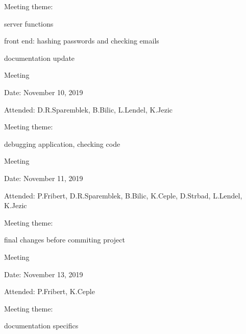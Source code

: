 \begin{packed_enum}
\begin{packed_item}
				\item Meeting theme:
				\begin{packed_item}
					\item  server functions
					\item  front end: hashing passwords and checking emails
					\item  documentation update
				\end{packed_item}
			\end{packed_item}
			\item  Meeting
			\item[] \begin{packed_item}
				\item Date: November 10, 2019
				\item Attended: D.R.Sparemblek, B.Bilic, L.Lendel, K.Jezic
				\item Meeting theme:
				\begin{packed_item}
					\item  debugging application, checking code
				\end{packed_item}
			\end{packed_item}
			\item  Meeting
			\item[] \begin{packed_item}
				\item Date: November 11, 2019
				\item Attended: P.Fribert, D.R.Sparemblek, B.Bilic, K.Ceple, D.Strbad, L.Lendel, K.Jezic
				\item Meeting theme:
				\begin{packed_item}
					\item  final changes before commiting project
				\end{packed_item}
			\end{packed_item}
			\item  Meeting
			\item[] \begin{packed_item}
				\item Date: November 13, 2019
				\item Attended: P.Fribert, K.Ceple
				\item Meeting theme:
				\begin{packed_item}
					\item  documentation specifics
				\end{packed_item}
			\end{packed_item}
			
			
			
			
		\end{packed_enum}
		
